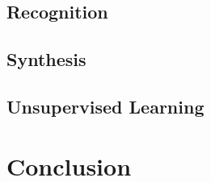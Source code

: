 \documentclass[12pt]{article}
\begin{document}
\subsection{Recognition}

\subsection{Synthesis}

\subsection{Unsupervised Learning}

\section{Conclusion}






\end{document}
